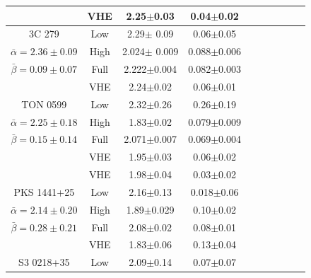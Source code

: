 \documentclass[11pt]{article}
\begin{document}
\begin{table}[htbp]
{\begin{tabular}{|c|c|c|c|c|c|c|c|c|c|}
         & VHE & 2.25$\pm$0.03 & 0.04$\pm$0.02 \\
    \hline
       3C 279 & Low & 2.29$\pm$ 0.09 & 0.06$\pm$0.05 \\ %
        $\bar{\alpha}=2.36\pm0.09$ & High & 2.024$\pm$ 0.009 & 0.088$\pm$0.006 \\ %
        $\bar{\beta}=0.09\pm0.07$ & Full & 2.222$\pm$0.004 & 0.082$\pm$0.003 \\ %
         & VHE & 2.24$\pm$0.02 & 0.06$\pm$0.01 \\
    \hline
       TON 0599 & Low & 2.32$\pm$0.26 & 0.26$\pm$0.19 \\ %
        $\bar{\alpha}=2.25\pm0.18$ & High & 1.83$\pm$0.02 & 0.079$\pm$0.009 \\ %
        $\bar{\beta}=0.15\pm0.14$ & Full & 2.071$\pm$0.007 & 0.069$\pm$0.004 \\ %
         & VHE & 1.95$\pm$0.03 & 0.06$\pm$0.02 \\
         & VHE & 1.98$\pm$0.04 & 0.03$\pm$0.02 \\
    \hline
       PKS 1441+25 & Low & 2.16$\pm$0.13 & 0.018$\pm$0.06 \\ %
        $\bar{\alpha}=2.14\pm0.20$ & High & 1.89$\pm$0.029 & 0.10$\pm$0.02 \\ %
        $\bar{\beta}=0.28\pm0.21$ & Full & 2.08$\pm$0.02 & 0.08$\pm$0.01 \\ %
         & VHE & 1.83$\pm$0.06 & 0.13$\pm$0.04 \\
    \hline
       S3 0218+35 & Low & 2.09$\pm$0.14 &  0.07$\pm$0.07 \\ %

\end{tabular}}
\end{table}
\end{document}
